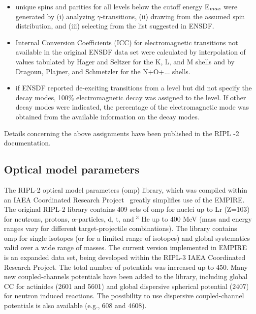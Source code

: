\begin{itemize}
\item unique spins and parities for all levels below the cutoff energy E$_{{%
max}}$ were generated by (i) analyzing $\gamma$-transitions, (ii) drawing
from the assumed spin distribution, and (iii) selecting from the list
suggested in ENSDF.

\item Internal Conversion Coefficients (ICC) for electromagnetic transitions
not available in the original ENSDF data set were calculated by
interpolation of values tabulated by Hager and Seltzer for the K, L, and M
shells and by Dragoun, Plajner, and Schmetzler for the N+O+... shells.

\item if ENSDF reported de-exciting transitions from a level but did not
specify the decay modes, 100\% electromagnetic decay was assigned to the
level. If other decay modes were indicated, the percentage of the
electromagnetic mode was obtained from the available information on the
decay modes.
\end{itemize}

Details concerning the above assignments have been published in the RIPL%
-2 documentation.

\subsection{Optical model parameters\label{sec:RIPLomp}}

The RIPL-2 optical model parameters (omp) library, which was compiled within
an IAEA Coordinated Research Project~\cite{RIPL2} greatly simplifies use of
the EMPIRE. The original RIPL-2 library contains 409 sets of omp for nuclei
up to Lr (Z=103) for neutrons, protons, $\alpha$-particles, d, t, and $^{3}$%
He up to 400 MeV (mass and energy ranges vary for different
target-projectile combinations). The library contains omp for single
isotopes (or for a limited range of isotopes) and global systematics valid
over a wide range of masses. The current version implemented in EMPIRE is an
expanded data set, being developed within the RIPL-3 IAEA Coordinated
Research Project. The total number of potentials was increased up to 450.
Many new coupled-channels potentials have been added to the library,
including global CC for actinides (2601 and 5601) and global dispersive
spherical potential (2407) for neutron induced reactions. The possibility to
use dispersive coupled-channel potentials is also available (e.g., 608 and
4608).

